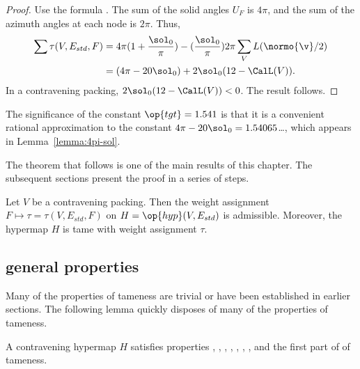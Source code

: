 \begin{proof}
Use the formula .
  The sum of the solid angles $U_F$ is $4\pi$, and the sum of the azimuth
  angles at each node is $2\pi$.
Thus,
\begin{align*}\label{eqn:delta0}
  \sum \tau (V,E_{std},F) 
  &= 4\pi (1 + \dfrac{\sol_0}{\pi}) 
- (\dfrac{\sol_0}{\pi}) 2\pi \sum_{V} L(\normo{\v}/2)\vspace{6pt}\\
&= (4\pi - 20\sol_0) + 2\sol_0 (12 - \CalL(V)).
\end{align*}
In a contravening packing, $2\sol_0(12-\CalL(V))<0$.
The result follows.
\end{proof}

The significance of the constant $\op{tgt}=1.541$ is that it is a
convenient rational approximation to the constant $4\pi -
20\sol_0=1.54065$\dots, which appears in Lemma~\ref{lemma:4pi-sol}.
%

The theorem that follows is one of the main results of this chapter.  The subsequent
sections present the proof in a series of steps.

\begin{theorem} \label{theorem:contravene}
  Let $V$ be a contravening packing.  Then the weight assignment
  $F\mapsto\tau=\tau(V,E_{std},F)$ on $H=\op{hyp}(V,E_{std})$ is
  admissible.  Moreover, the hypermap $H$ is tame with weight
  assignment $\tau$.
\end{theorem}
%
%
%



\subsection{general properties}
\label{sec:startame}


Many of the properties of tameness are trivial or have been
established in earlier sections.  The following lemma quickly disposes
of many of the properties of tameness.

\begin{lemma}[]\label{lemma:multi}
  A contravening hypermap $H$ satisfies properties ,
  , , , , , , and the first
  part of 
of tameness.
\end{lemma}

